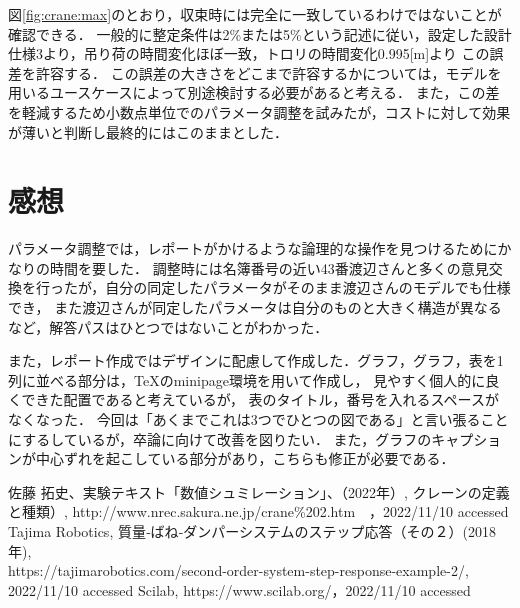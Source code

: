 \documentclass[dvipdfmx,titlepage,a4j]{jsarticle}  %
\begin{document}
図\ref{fig:crane:max}のとおり，収束時には完全に一致しているわけではないことが確認できる．
一般的に整定条件は2\%または5\%という記述に従い，設定した設計仕様3より，吊り荷の時間変化ほぼ一致，トロリの時間変化0.995[m]より
この誤差を許容する．
この誤差の大きさをどこまで許容するかについては，モデルを用いるユースケースによって別途検討する必要があると考える．
また，この差を軽減するため小数点単位でのパラメータ調整を試みたが，コストに対して効果が薄いと判断し最終的にはこのままとした．

\section{感想}
パラメータ調整では，レポートがかけるような論理的な操作を見つけるためにかなりの時間を要した．
調整時には名簿番号の近い43番渡辺さんと多くの意見交換を行ったが，自分の同定したパラメータがそのまま渡辺さんのモデルでも仕様でき，
また渡辺さんが同定したパラメータは自分のものと大きく構造が異なるなど，解答パスはひとつではないことがわかった．

また，レポート作成ではデザインに配慮して作成した．グラフ，グラフ，表を1列に並べる部分は，\TeX のminipage環境を用いて作成し，
見やすく個人的に良くできた配置であると考えているが，
表のタイトル，番号を入れるスペースがなくなった．
今回は「あくまでこれは3つでひとつの図である」と言い張ることにするしているが，卒論に向けて改善を図りたい．
また，グラフのキャプションが中心ずれを起こしている部分があり，こちらも修正が必要である．

\begin{thebibliography}{99}
   佐藤 拓史、実験テキスト「数値シュミレーション」、（2022年）,
   クレーンの定義と種類）, http://www.nrec.sakura.ne.jp/crane\%202.htm　，2022/11/10 accessed
   Tajima Robotics, 質量‐ばね‐ダンパーシステムのステップ応答（その２）(2018年), \\ https://tajimarobotics.com/second-order-system-step-response-example-2/, 2022/11/10 accessed
   Scilab, https://www.scilab.org/，2022/11/10 accessed
\end{thebibliography}
\end{document}

